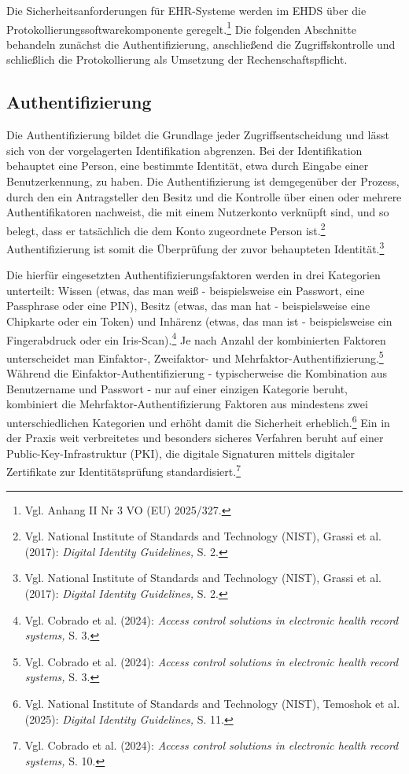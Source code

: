 Die Sicherheitsanforderungen für EHR-Systeme werden im EHDS über die Protokollierungssoftwarekomponente geregelt.\footnote{Vgl. Anhang II Nr 3 VO (EU) 2025/327.} Die folgenden Abschnitte behandeln zunächst die Authentifizierung, anschließend die Zugriffskontrolle  und schließlich die Protokollierung als Umsetzung der Rechenschaftspflicht.

    \subsection{Authentifizierung}
Die Authentifizierung bildet die Grundlage jeder Zugriffsentscheidung und lässt sich von der vorgelagerten Identifikation abgrenzen. Bei der Identifikation behauptet eine Person, eine bestimmte Identität, etwa durch Eingabe einer Benutzerkennung, zu haben. Die Authentifizierung ist demgegenüber der Prozess, durch den ein Antragsteller den Besitz und die Kontrolle über einen oder mehrere Authentifikatoren nachweist, die mit einem Nutzerkonto verknüpft sind, und so belegt, dass er tatsächlich die dem Konto zugeordnete Person ist.\footnote{Vgl. National Institute of Standards and Technology (NIST), Grassi et al. (2017):  \textit{Digital Identity Guidelines,} S. 2.} Authentifizierung ist somit die Überprüfung der zuvor behaupteten Identität.\footnote{Vgl. National Institute of Standards and Technology (NIST), Grassi et al. (2017):  \textit{Digital Identity Guidelines,} S. 2.}

Die hierfür eingesetzten Authentifizierungsfaktoren werden in drei Kategorien unterteilt: Wissen (etwas, das man weiß - beispielsweise ein Passwort, eine Passphrase oder eine PIN), Besitz (etwas, das man hat - beispielsweise eine Chipkarte oder ein Token) und Inhärenz (etwas, das man ist - beispielsweise ein Fingerabdruck oder ein Iris-Scan).\footnote{Vgl. Cobrado et al. (2024):  \textit{Access control solutions in electronic health record systems,} S. 3.}
Je nach Anzahl der kombinierten Faktoren unterscheidet man Einfaktor-, Zweifaktor- und Mehrfaktor-Authentifizierung.\footnote{Vgl. Cobrado et al. (2024):  \textit{Access control solutions in electronic health record systems,} S. 3.}  Während die Einfaktor-Authentifizierung - typischerweise die Kombination aus Benutzername und Passwort - nur auf einer einzigen Kategorie beruht, kombiniert die Mehrfaktor-Authentifizierung Faktoren aus mindestens zwei unterschiedlichen Kategorien und erhöht damit die Sicherheit erheblich.\footnote{Vgl. National Institute of Standards and Technology (NIST), Temoshok et al. (2025):  \textit{Digital Identity Guidelines,} S. 11.} Ein in der Praxis weit verbreitetes und besonders sicheres Verfahren beruht auf einer Public-Key-Infrastruktur (PKI), die digitale Signaturen mittels digitaler Zertifikate zur Identitätsprüfung standardisiert.\footnote{Vgl. Cobrado et al. (2024):  \textit{Access control solutions in electronic health record systems,} S. 10.}

